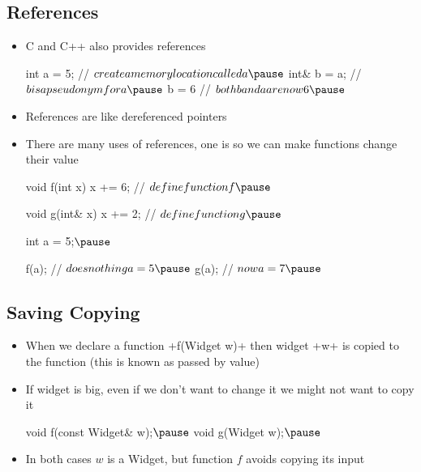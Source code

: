 
\begin{slide}
\section[-2]{References}
  
\begin{PauseHighLight}
  \begin{itemize}
  \item C and C++ also provides references
    \begin{cpp}
      int a = 5;         // $create a memory location called a\pause$
      int& b = a;        // $b is a pseudonym for a\pause$
      b = 6              // $both b and a are now 6\pause$
    \end{cpp}
  \item References are like dereferenced pointers\pause
  \item There are many uses of references, one is so we can make
    functions change their value
    \begin{cpp}
      void f(int x) {x += 6;}   // $define function f\pause$

      void g(int& x) {x += 2;}  // $define function g\pause$
      
      int a = 5;$\pause$
      
      f(a);                      // $does nothing a=5\pause$
      g(a);                      // $now a=7\pause$
    \end{cpp}
  \end{itemize}
\end{PauseHighLight}

\end{slide}


\begin{slide}
\section{Saving Copying}

\begin{PauseHighLight}
  \begin{itemize}
  \item When we declare a function \jl+f(Widget w)+ then widget \jl+w+
    is copied to the function (this is known as passed by value)\pause
  \item If widget is big, even if we don't want to change it we might
    not want to copy it
    \begin{cpp}
      void f(const Widget& w);$\pause$
      void g(Widget w);$\pause$
    \end{cpp}
  \item In both cases \jl$w$ is a Widget, but function \jl$f$ avoids
    copying its input\pause
  \end{itemize}
\end{PauseHighLight}

\end{slide}


